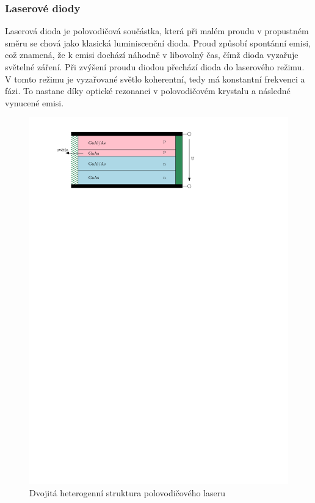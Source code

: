 \subsubsection{Laserové diody}
Laserová dioda je polovodičová součástka, která při malém proudu v propustném směru se chová jako klasická luminiscenční dioda. Proud způsobí spontánní emisi, což znamená, že k emisi dochází náhodně v libovolný čas, čímž dioda vyzařuje světelné záření. Při zvýšení proudu diodou přechází dioda do laserového režimu. V tomto režimu je vyzařované světlo koherentní, tedy má konstantní frekvenci a fázi. To nastane díky optické rezonanci v polovodičovém krystalu a následné vynucené emisi.

\begin{figure}[H]
    \begin{center}
        \includegraphics[scale=1]{img/laser}
    \end{center}
    \caption{Dvojitá heterogenní struktura polovodičového laseru}
\end{figure}

